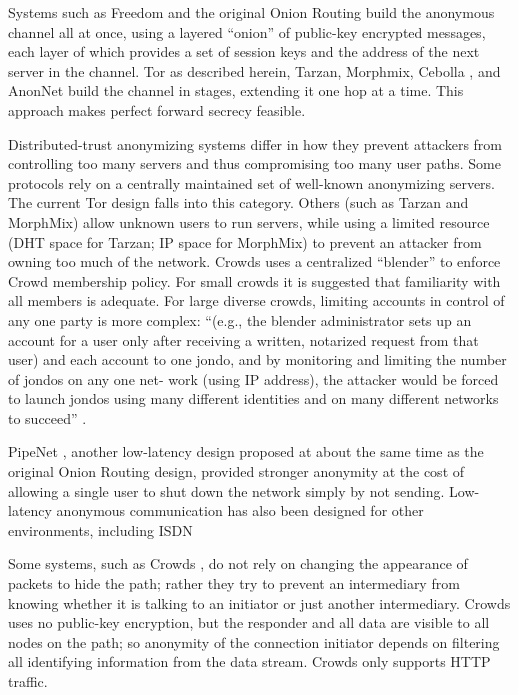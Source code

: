 \documentclass[times,10pt,twocolumn]{article}
\begin{document}
\cite{tarzan:ccs02}
\cite{morphmix:fc04}

Systems such as Freedom and the original Onion Routing
build the anonymous channel all at once, using a layered ``onion'' of
public-key encrypted messages, each layer of which provides a set of session
keys and the address of the next server in the channel.  Tor as described
herein, Tarzan, Morphmix, Cebolla \cite{cebolla}, and AnonNet
\cite{anonnet} build the
channel in stages, extending it one hop at a time. This approach
makes perfect forward secrecy feasible.

Distributed-trust anonymizing systems differ in how they prevent attackers
from controlling too many servers and thus compromising too many user paths.
Some protocols rely on a centrally maintained set of well-known anonymizing
servers.  The current Tor design falls into this category.
Others (such as Tarzan and MorphMix) allow unknown users to run
servers, while using a limited resource (DHT space for Tarzan; IP space for
MorphMix) to prevent an attacker from owning too much of the network.
Crowds uses a centralized ``blender'' to enforce Crowd membership
policy. For small crowds it is suggested that familiarity with all
members is adequate. For large diverse crowds, limiting accounts in
control of any one party is more complex: 
``(e.g., the blender administrator sets up an account for a user only
after receiving a written, notarized request from that user) and each
account to one jondo, and by monitoring and limiting the number of
jondos on any one net- work (using IP address), the attacker would be
forced to launch jondos using many different identities and on many
different networks to succeed'' \cite{crowds-tissec}.

PipeNet \cite{back01, pipenet}, another low-latency design proposed at
about the same time as the original Onion Routing design, provided
stronger anonymity at the cost of allowing a single user to shut
down the network simply by not sending.  Low-latency anonymous
communication has also been designed for other environments, including
ISDN \cite{isdn-mixes}

Some systems, such as Crowds \cite{crowds-tissec}, do not rely on changing the
appearance of packets to hide the path; rather they try to prevent an
intermediary from knowing whether it is talking to an initiator
or just another intermediary.  Crowds uses no public-key
encryption, but the responder and all data are visible to all
nodes on the path; so anonymity of the connection initiator depends on
filtering all identifying information from the data stream. Crowds only
supports HTTP traffic.
\end{document}
